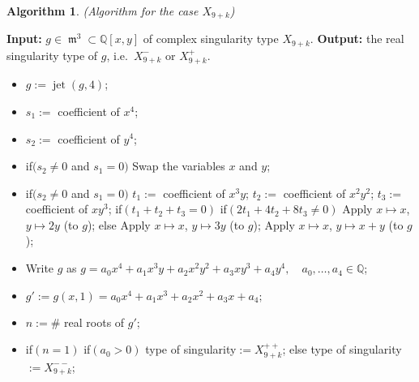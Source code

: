 \documentclass[noend]{amsproc}
\DeclareMathOperator{\m}{\mathfrak{m}}
\DeclareMathOperator{\jt}{jet}
\begin{document}
\newtheorem{X[9+k]}[kjet]{Algorithm}
\begin{X[9+k]}(Algorithm for the case $X_{9+k}$)\label{X[9+k]}
\end{X[9+k]}
\noindent\textnormal{\bf Input:} $g\in \m^3\subset\mathbb Q[x,y]$ of complex
singularity type $X_{9+k}$.\newline
\textnormal{\bf Output:} the real singularity type of $g$, i.e.~$X_{9+k}^-$
or $X_{9+k}^+$.
\begin{itemize}
\item $g:=\jt(g,4)$;
\item $s_1:=$ coefficient of ${x^4}$;
\item $s_2:=$ coefficient of ${y^4}$;
\item if$(s_2\neq0$ and $s_1=0)$\newline
\phantom{}\quad Swap the variables $x$ and $y$;\newline
\item if$(s_2\neq0$ and $s_1=0)$\newline
\phantom{}\quad $t_1:=$ coefficient of ${x^3y}$;\newline
\phantom{}\quad $t_2:=$ coefficient of ${x^2y^2}$;\newline
\phantom{}\quad $t_3:=$ coefficient of ${xy^3}$;\newline
\phantom{}\quad if$(t_1+t_2+t_3=0)$\newline
\phantom{}\quad\quad if$(2t_1+4t_2+8t_3\neq0)$\newline
\phantom{}\quad\quad\quad Apply $x\mapsto x$, $y\mapsto 2y$ (to $g$);\newline
\phantom{}\quad\quad else\newline
\phantom{}\quad\quad\quad Apply $x\mapsto x$, $y\mapsto 3y$ (to $g$);\newline
\phantom{}\quad Apply $x\mapsto x$, $y\mapsto x+y$ (to $g$);
\item Write $g$ as $g=a_0x^4+a_1x^3y+a_2x^2y^2+a_3xy^3+a_4y^4,\quad
a_0,\ldots,a_4\in\mathbb Q$;
\item $g':=g(x,1)=a_0x^4+a_1x^3+a_2x^2+a_3x+a_4;$
\item $n:=\#$ real roots of $g'$;
\item if$(n=1)$\newline
\phantom{}\quad if$(a_0>0)$\newline
\phantom{}\quad\quad type of singularity$ :=X_{9+k}^{++}$;\newline
\phantom{}\quad else\newline
\phantom{}\quad\quad type of singularity$ := X_{9+k}^{--}$;

\end{itemize}
\end{document}
